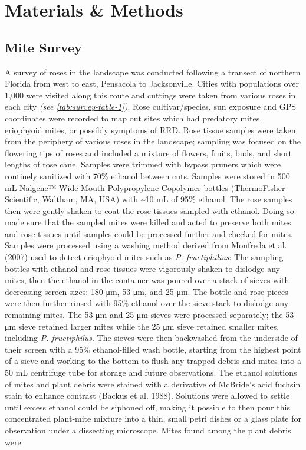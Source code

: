 \documentclass[12pt,final,CPage]{ufthesis}
\begin{document}
{  \hypertarget{mm-survey-pheno}{%
  \section{Materials \& Methods}\label{mm-survey-pheno}}

  \hypertarget{mm-survey}{%
  \subsection{Mite Survey}\label{mm-survey}}

  A survey of roses in the landscape was conducted following a transect of northern Florida from west to east, Pensacola to Jacksonville. Cities with populations over 1,000 were visited along this route and cuttings were taken from various roses in each city \emph{(see \ref{tab:survey-table-1})}. Rose cultivar/species, sun exposure and GPS coordinates were recorded to map out sites which had predatory mites, eriophyoid mites, or possibly symptoms of RRD. Rose tissue samples were taken from the periphery of various roses in the landscape; sampling was focused on the flowering tips of roses and included a mixture of flowers, fruits, buds, and short lengths of rose cane. Samples were trimmed with bypass pruners which were routinely sanitized with 70\% ethanol between cuts. Samples were stored in 500 \si{\milli\liter} Nalgene™ Wide-Mouth Polypropylene Copolymer bottles (ThermoFisher Scientific, Waltham, MA, USA) with \textasciitilde10 \si{\milli\liter} of 95\% ethanol. The rose samples then were gently shaken to coat the rose tissues sampled with ethanol. Doing so made sure that the sampled mites were killed and acted to preserve both mites and rose tissues until samples could be processed further and checked for mites. Samples were processed using a washing method derived from Monfreda et al. (2007) used to detect eriophyoid mites such as \emph{P. fructiphilius}: The sampling bottles with ethanol and rose tissues were vigorously shaken to dislodge any mites, then the ethanol in the container was poured over a stack of sieves with decreasing screen sizes: 180 \si{\micro\metre}, 53 \si{\micro\metre}, and 25 \si{\micro\metre}. The bottle and rose pieces were then further rinsed with 95\% ethanol over the sieve stack to dislodge any remaining mites. The 53 \si{\micro\metre} and 25 \si{\micro\metre} sieves were processed separately; the 53 \si{\micro\metre} sieve retained larger mites while the 25 \si{\micro\metre} sieve retained smaller mites, including \emph{P. fructiphilus}. The sieves were then backwashed from the underside of their screen with a 95\% ethanol-filled wash bottle, starting from the highest point of a sieve and working to the bottom to flush any trapped debris and mites into a 50 \si{\milli\liter} centrifuge tube for storage and future observations. The ethanol solutions of mites and plant debris were stained with a derivative of McBride's acid fuchsin stain to enhance contrast (Backus et al. 1988). Solutions were allowed to settle until excess ethanol could be siphoned off, making it possible to then pour this concentrated plant-mite mixture into a thin, small petri dishes or a glass plate for observation under a dissecting microscope. Mites found among the plant debris were }
\end{document}
